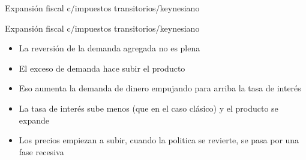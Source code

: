 \documentclass{beamer}
\begin{document}
\begin{frame}{Expansión fiscal c/impuestos transitorios/keynesiano}
\begin{center}
\begin{figure}[H]
\begin{center}
\begin{minipage}[b]{0.45\textwidth}
\begin{center}
\end{center}
\end{minipage}
\end{center}
\end{figure}
\end{center} 
\end{frame}

\begin{frame}{Expansión fiscal c/impuestos transitorios/keynesiano}
   
\begin{itemize}
    \item La reversión de la demanda agregada no es plena
    \item El exceso de demanda hace subir el producto 
    \item Eso aumenta la demanda de dinero empujando para arriba la tasa de interés 
    \item La tasa de interés sube menos (que en el caso clásico) y el producto se expande 
    \item Los precios empiezan  a subir, cuando la politica se revierte, se pasa por una fase recesiva 
\end{itemize}
    
\end{frame}


\end{document}
